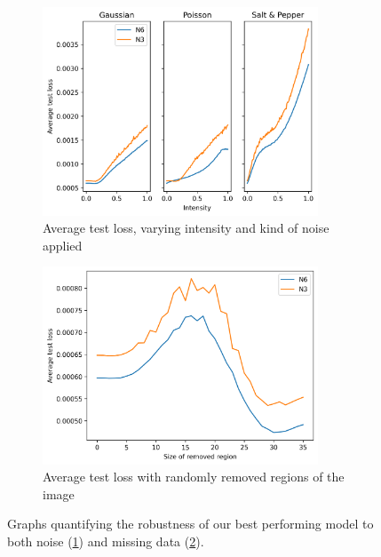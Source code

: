 \documentclass[twocolumn]{article}
\begin{document}
\begin{figure}
    \centering
    \begin{subfigure}{0.4\textwidth}
        \centering
        \includegraphics[width=0.9\textwidth]{assets/noise-results.png}
        \caption{Average test loss, varying intensity and kind of noise applied}
        \label{fig:robust-results}
    \end{subfigure}\hfill
    \begin{subfigure}{0.4\textwidth}
        \centering
        \includegraphics[width=0.9\textwidth]{assets/missing-data.png}
        \caption{Average test loss with randomly removed regions of the image}
        \label{fig:missing-results}
    \end{subfigure}
    \caption{Graphs quantifying the robustness of our best performing model to both noise (\ref{fig:robust-results}) and missing data (\ref{fig:missing-results}).}
    \label{fig:robustness}
\end{figure}
\end{document}
